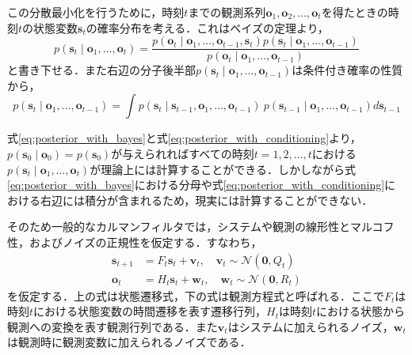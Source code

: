     この分散最小化を行うために，時刻$t$までの観測系列$\bm{o}_1, \bm{o}_2, \dots, \bm{o}_t$を得たときの時刻$t$の状態変数$\bm{s}_t$の確率分布を考える．これはベイズの定理より，
    \begin{equation}
        \label{eq:posterior_with_bayes}
        p(\bm{s}_t \mid \bm{o}_1,\dots, \bm{o}_t ) = \frac{p(\bm{o}_t \mid \bm{o}_1,\dots, \bm{o}_{t-1}, \bm{s}_t) p(\bm{s}_t \mid \bm{o}_1,\dots, \bm{o}_{t-1})}{p(\bm{o}_t \mid \bm{o}_1,\dots, \bm{o}_{t-1})}
    \end{equation}
    と書き下せる．また右辺の分子後半部$p(\bm{s}_t \mid \bm{o}_1,\dots, \bm{o}_{t-1})$は条件付き確率の性質から，
    \begin{equation}
        \label{eq:posterior_with_conditioning}
        p(\bm{s}_t \mid \bm{o}_1,\dots, \bm{o}_{t-1}) = \int p(\bm{s}_t \mid \bm{s}_{t-1}, \bm{o}_1, \dots, \bm{o}_{t-1}) ~ p(\bm{s}_{t-1} \mid \bm{o}_1, \dots, \bm{o}_{t-1}) d\bm{s}_{t-1}
    \end{equation}

    式\ref{eq:posterior_with_bayes}と式\ref{eq:posterior_with_conditioning}より，$p(\bm{s}_0 \mid \bm{o}_0) = p(\bm{s}_0)$が与えられればすべての時刻$t = 1, 2, \dots, t$における$p(\bm{s}_t \mid \bm{o}_1,\dots, \bm{o}_t)$が理論上には計算することができる．しかしながら式\ref{eq:posterior_with_bayes}における分母や式\ref{eq:posterior_with_conditioning}における右辺には積分が含まれるため，現実には計算することができない．

    そのため一般的なカルマンフィルタでは，システムや観測の線形性とマルコフ性，およびノイズの正規性を仮定する．すなわち，
    \begin{equation}
        \label{eq:kalman_GL}
        \begin{aligned}
            \bm{s}_{t+1} &= F_t \bm{s}_t + \bm{v}_t, \quad \bm{v}_t \sim \mathcal{N}(\bm{0}, Q_t)
            \\ \bm{o}_t &= H_t \bm{s}_t + \bm{w}_t, \quad \bm{w}_t \sim \mathcal{N}(\bm{0}, R_t)
        \end{aligned}        
    \end{equation}
    を仮定する．上の式は状態遷移式，下の式は観測方程式と呼ばれる．ここで$F_t$は時刻$t$における状態変数の時間遷移を表す遷移行列，$H_t$は時刻$t$における状態から観測への変換を表す観測行列である．また$\bm{v}_t$はシステムに加えられるノイズ，$\bm{w}_t$は観測時に観測変数に加えられるノイズである．

